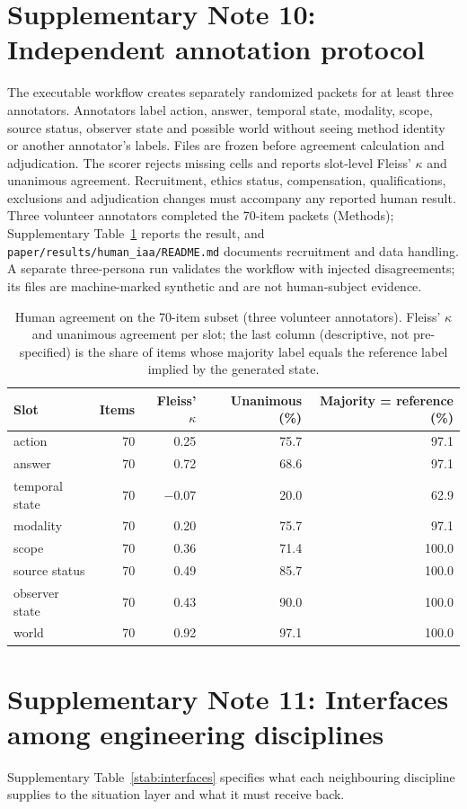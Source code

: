 \documentclass[Numbered]{sn-jnl}
\begin{document}
\section*{Supplementary Note 10: Independent annotation protocol}
The executable workflow creates separately randomized packets for at least three
annotators. Annotators label action, answer, temporal state, modality, scope,
source status, observer state and possible world without seeing method identity
or another annotator's labels. Files are frozen before agreement calculation
and adjudication. The scorer rejects missing cells and reports slot-level
Fleiss' $\kappa$ and unanimous agreement. Recruitment, ethics status,
compensation, qualifications, exclusions and adjudication changes must
accompany any reported human result. Three volunteer annotators completed the 70-item
packets (Methods); Supplementary Table~\ref{stab:human-iaa} reports the result, and
\texttt{paper/results/human\_iaa/README.md} documents recruitment and data handling. A separate
three-persona run validates the workflow with injected disagreements; its files
are machine-marked synthetic and are not human-subject evidence.

\begin{table}[!ht]
\centering\small
\caption{Human agreement on the 70-item subset (three volunteer annotators). Fleiss'
$\kappa$ and unanimous agreement per slot; the last column (descriptive, not
pre-specified) is the share of items whose majority label equals the reference label
implied by the generated state.}
\label{stab:human-iaa}
\begin{tabular}{lrrrr}
\toprule
Slot & Items & Fleiss' $\kappa$ & Unanimous (\%) & Majority = reference (\%) \\
\midrule
action & 70 & 0.25 & 75.7 & 97.1 \\
answer & 70 & 0.72 & 68.6 & 97.1 \\
temporal state & 70 & $-$0.07 & 20.0 & 62.9 \\
modality & 70 & 0.20 & 75.7 & 97.1 \\
scope & 70 & 0.36 & 71.4 & 100.0 \\
source status & 70 & 0.49 & 85.7 & 100.0 \\
observer state & 70 & 0.43 & 90.0 & 100.0 \\
world & 70 & 0.92 & 97.1 & 100.0 \\
\bottomrule
\end{tabular}
\end{table}

\section*{Supplementary Note 11: Interfaces among engineering disciplines}
Supplementary Table~\ref{stab:interfaces} specifies what each neighbouring
discipline supplies to the situation layer and what it must receive back.
\end{document}
